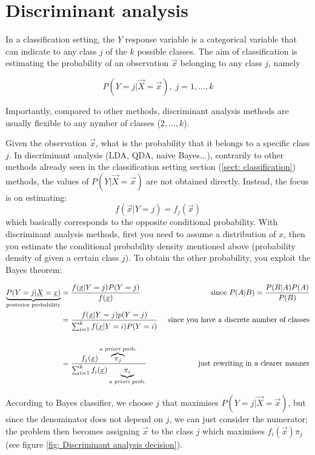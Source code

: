 \graphicspath{{chapters/images/0206/}}

\chapter{Discriminant analysis} 

  In a classification setting, the $Y$ response variable is a categorical
  variable that can indicate to any class $j$ of the $k$ possible classes. The
  aim of classification is estimating the probability of an observation
  $\vec{x}$ belonging to any class $j$, namely 
  
  $$P(Y=j|\vec{X}=\vec{x}),\; j = 1, \dots, k$$ 
  
  Importantly, compared to other methods, discriminant analysis methods are
  usually flexible to any nymber of classes ($2, \dots, k$).
  
  Given the observation $\vec{x}$, what is the probability that it belongs to a
  specific class $j$. In discriminant analysis (LDA, QDA, naive Bayes...),
  contrarily to other methods already seen in the classification setting section
  (\ref{sect: classification}) methods, the values of $P(Y | \vec{X} = \vec{x})$
  are not obtained directly. Instead, the focus is on estimating:
  $$f(\vec{x}|Y=j) = f_j(\vec{x})$$ which basically corresponds to the opposite
  conditional probability. With discriminant analysis methods, first you need to
  assume a distribution of $x$, then you estimate the conditional probability
  density mentioned above (probability density of  given a certain class
  $j$). To obtain the other probability, you exploit the Bayes theorem:

  \begin{align*}
  \underbrace{P(Y=j|\vec{X}=\vec{x})}_\text{posterior probability}  
    &= \frac{f(\vec{x}|Y=j)P(Y=j)}{f(\vec{x})}
    & \text{ since } P(A|B) = \frac{P(B|A)P(A)}{P(B)} \\
    &= \frac{f(\vec{x}|Y=j)p(Y=j)}{\sum_{i = 1}^k f(\vec{x}|Y = i)P(Y=i)}
    & \text{ since you have a discrete number of classes} \\\\
    &= \frac{f_j(\vec{x})\overbrace{\pi_j}^\text{\textit{a priori} prob.}}{\sum_{i = 1}^k f_i(\vec{x})\underbrace{\pi_i}_\text{\textit{a priori} prob.}}
    & \text{ just rewriting in a clearer manner}\\
  \end{align*}

  According to Bayes classifier, we choose $j$ that maximises
  $P(Y=j|\vec{X}=\vec{x})$, but since the denominator does not depend on $j$, we
  can just consider the numerator; the problem then becomes assigning $\vec{x}$
  to the class $j$ which maximises $f_i(\vec{x})\pi_j$ (see figure \ref{fig:
  Discriminant analysis decision}).

